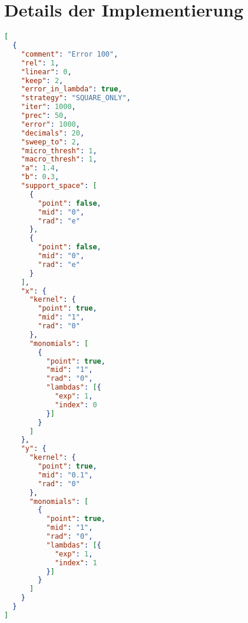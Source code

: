 
\section*{Details der Implementierung}

\begin{lstlisting}[language=JSON, caption=Bespielkonfiguration,captionpos=b, label=list:config]
 [
  {
    "comment": "Error 100",
    "rel": 1,
    "linear": 0,
    "keep": 2,
    "error_in_lambda": true,
    "strategy": "SQUARE_ONLY",
    "iter": 1000,
    "prec": 50,
    "error": 1000,
    "decimals": 20,
    "sweep_to": 2,
    "micro_thresh": 1,
    "macro_thresh": 1,
    "a": 1.4,
    "b": 0.3,
    "support_space": [
      {
        "point": false,
        "mid": "0",
        "rad": "e"
      },
      {
        "point": false,
        "mid": "0",
        "rad": "e"
      }
    ],
    "x": {
      "kernel": {
        "point": true,
        "mid": "1",
        "rad": "0"
      },
      "monomials": [
        {
          "point": true,
          "mid": "1",
          "rad": "0",
          "lambdas": [{
            "exp": 1,
            "index": 0
          }]
        }
      ]
    },
    "y": {
      "kernel": {
        "point": true,
        "mid": "0.1",
        "rad": "0"
      },
      "monomials": [
        {
          "point": true,
          "mid": "1",
          "rad": "0",
          "lambdas": [{
            "exp": 1,
            "index": 1
          }]
        }
      ]
    }
  }
]
\end{lstlisting}
